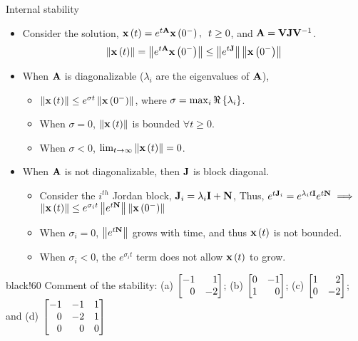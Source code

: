 \documentclass[aspectratio=169]{beamer}
\def\mf{\ensuremath\mathbf}
\def\lp{\ensuremath\left(}
\def\rp{\ensuremath\right)}
\def\lV{\ensuremath\left\lVert}
\def\rV{\ensuremath\right\rVert}
\def\lc{\ensuremath\left\{}
\def\rc{\ensuremath\right\}}
\def\bmx{\ensuremath\begin{bmatrix*}[r]}
\def\emx{\ensuremath\end{bmatrix*}}
\newcommand{\demoex}[2]{\onslide<#1->\begin{color}{black!60} #2 \end{color}}
\newcommand{\ct}[1]{\lp #1\rp}
\begin{document}
\begin{frame}{Internal stability}
\begin{itemize}
    \item Consider the solution, $\mf{x}\ct{t} = e^{t\mf{A}}\mf{x}\ct{0^-}, \,\,\, t \geq 0$, and $\mf{A} = \mf{V}\mf{J}\mf{V}^{-1}$.
    \[ \lV \mf{x}\ct{t} \rV = \lV e^{t\mf{A}}\mf{x}\ct{0^-} \rV \leq \lV e^{t\mf{J}} \rV \lV \mf{x}\ct{0^-} \rV\]

    \item When $\mf{A}$ is diagonalizable ($\lambda_i$ are the eigenvalues of $\mf{A}$),
    \begin{itemize}
        \item $ \lV \mf{x}\ct{t} \rV \leq  e^{\sigma t} \lV \mf{x}\ct{0^-} \rV$, where $\sigma = \max_i \Re \lc \lambda_i \rc$.
        \item When $\sigma = 0$, $\lV \mf{x}\ct{t}\rV$ is bounded $\forall t \geq 0$.
        \item When $\sigma < 0$, $\lim_{t \to \infty} \lV \mf{x}\ct{t}\rV = 0$.
    \end{itemize}\vspace{0.2cm}

    \item When $\mf{A}$ is not diagonalizable, then $\mf{J}$ is block diagonal.
    \begin{itemize}
        \item Consider the $i^{th}$ Jordan block, $\mf{J}_i = \lambda_i \mf{I} + \mf{N}$, Thus, $e^{t\mf{J}_i} = e^{\lambda_i t\mf{I}}e^{t\mf{N}} \implies $ $ \lV \mf{x}\ct{t} \rV \leq e^{\sigma_i t} \lV e^{t\mf{N}} \rV \lV \mf{x}\ct{0^-} \rV$

        \item When $\sigma_i = 0$, $\lV e^{t\mf{N}} \rV$ grows with time, and thus $\mf{x}\ct{t}$ is not bounded. 

        \item When $\sigma_i < 0$, the $e^{\sigma_i t}$ term does not allow $\mf{x}\ct{t}$ to grow. 
    \end{itemize}
\end{itemize}
\demoex{2}{\small Comment of the stability: (a) $\bmx -1 & 1\\ 0 & -2\emx$; (b) $\bmx 0 & -1\\ 1 & 0\emx$; (c) $\bmx 1 & 2\\ 0 & -2\emx$;  and (d) $\bmx -1 & -1 & 1\\ 0 & -2 & 1\\ 0 & 0 & 0\emx$}
\end{frame}
 
\end{document}
